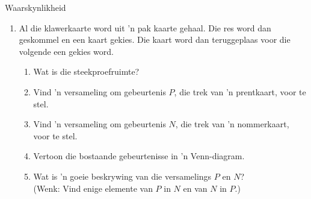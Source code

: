 \begin{eocexercises}{Waarskynlikheid}
\begin{enumerate}[itemsep=5pt, label=\textbf{\arabic*}.]
  \item Al die klawerkaarte word uit 'n pak kaarte gehaal. Die res word dan geskommel en een kaart gekies. Die kaart word dan teruggeplaas voor die volgende een gekies word.
    \begin{enumerate}[noitemsep, label=\textbf{(\alph*)} ]
    \item Wat is die steekproefruimte?
    \item Vind 'n versameling om gebeurtenis $P$, die trek van 'n prentkaart, voor te stel.
    \item Vind 'n versameling om gebeurtenis $N$, die trek van 'n nommerkaart, voor te stel.
    \item Vertoon die bostaande gebeurtenisse in 'n Venn-diagram.
    \item Wat is 'n goeie beskrywing van die versamelings $P$ en $N$?
     \\ (Wenk: Vind enige elemente van $P$ in $N$ en van $N$ in $P$.)
    \end{enumerate}


\end{enumerate}
\end{eocexercises}
